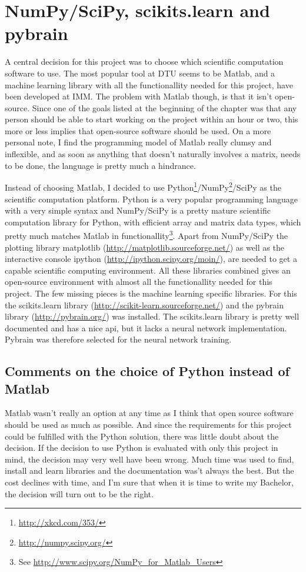 \section{NumPy/SciPy, scikits.learn and pybrain}
A central decision for this project was to choose which scientific computation software to use. The most popular tool at DTU seems to be Matlab, and a machine learning library with all the functionallity needed for this project, have been developed at IMM. The problem with Matlab though, is that it isn't open-source. Since one of the goals listed at the beginning of the chapter was that any person should be able to start working on the project within an hour or two, this more or less implies that open-source software should be used. On a more personal note, I find the programming model of Matlab really clumsy and inflexible, and as soon as anything that doesn't naturally involves a matrix, needs to be done, the language is pretty much a hindrance. \par
Instead of choosing Matlab, I decided to use Python\footnote{\url{http://xkcd.com/353/}}/NumPy\footnote{\url{http://numpy.scipy.org/}}/SciPy as the scientific computation platform. Python is a very popular programming language with a very simple syntax and NumPy/SciPy is a pretty mature scientific computation library for Python, with efficient array and matrix data types, which pretty much matches Matlab in functionallity\footnote{See \url{http://www.scipy.org/NumPy_for_Matlab_Users}}. Apart from NumPy/SciPy the plotting library matplotlib (\url{http://matplotlib.sourceforge.net/}) as well as the interactive console ipython (\url{http://ipython.scipy.org/moin/}), are needed to get a capable scientific computing environment. All these libraries combined gives an open-source environment with almost all the functionallity needed for this project. The few missing pieces is the machine learning specific libraries. For this the scikits.learn library (\url{http://scikit-learn.sourceforge.net/}) and the pybrain library (\url{http://pybrain.org/}) was installed. The scikits.learn library is pretty well documented and has a nice api, but it lacks a neural network implementation. Pybrain was therefore selected for the neural network training. 

\subsection{Comments on the choice of Python instead of Matlab}
Matlab wasn't really an option at any time as I think that open source software should be used as much as possible. And since the requirements for this project could be fulfilled with the Python solution, there was little doubt about the decision. If the decision to use Python is evaluated with only this project in mind, the decision may very well have been wrong. Much time was used to find, install and learn libraries and the documentation was't always the best. But the cost declines with time, and I'm sure that when it is time to write my Bachelor, the decision will turn out to be the right. 


